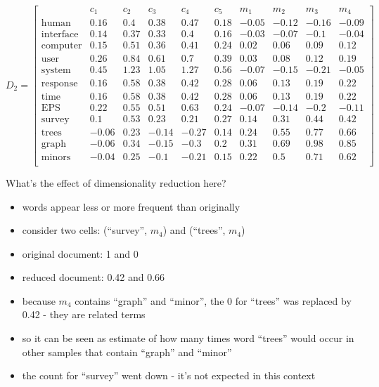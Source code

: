 $$D_2 =
\left[\begin{array}{c|ccccccccc}
 & c_1 & c_2 & c_3 & c_4 & c_5 & m_1 & m_2 & m_3 & m_4 \\
\hline
\text{human} & 0.16 & 0.4 & 0.38 & 0.47 & 0.18 & -0.05 & -0.12 & -0.16 & -0.09 \\
\text{interface} & 0.14 & 0.37 & 0.33 & 0.4 & 0.16 & -0.03 & -0.07 & -0.1 & -0.04 \\
\text{computer} & 0.15 & 0.51 & 0.36 & 0.41 & 0.24 & 0.02 & 0.06 & 0.09 & 0.12 \\
\text{user} & 0.26 & 0.84 & 0.61 & 0.7 & 0.39 & 0.03 & 0.08 & 0.12 & 0.19 \\
\text{system} & 0.45 & 1.23 & 1.05 & 1.27 & 0.56 & -0.07 & -0.15 & -0.21 & -0.05 \\
\text{response} & 0.16 & 0.58 & 0.38 & 0.42 & 0.28 & 0.06 & 0.13 & 0.19 & 0.22 \\
\text{time} & 0.16 & 0.58 & 0.38 & 0.42 & 0.28 & 0.06 & 0.13 & 0.19 & 0.22 \\
\text{EPS} & 0.22 & 0.55 & 0.51 & 0.63 & 0.24 & -0.07 & -0.14 & -0.2 & -0.11 \\
\text{survey} & 0.1 & 0.53 & 0.23 & 0.21 & 0.27 & 0.14 & 0.31 & 0.44 & 0.42 \\
\text{trees} &-0.06 & 0.23 & -0.14 & -0.27 & 0.14 & 0.24 & 0.55 & 0.77 & 0.66 \\
\text{graph} &-0.06 & 0.34 & -0.15 & -0.3 & 0.2 & 0.31 & 0.69 & 0.98 & 0.85 \\
\text{minors} &-0.04 & 0.25 & -0.1 & -0.21 & 0.15 & 0.22 & 0.5 & 0.71 & 0.62 \\
\end{array}\right]$$


What's the effect of dimensionality reduction here?

\begin{itemize}
\itemsep1pt\parskip0pt
\item
  words appear less or more frequent than originally
\item
  consider two cells: (``survey'', $m_4$) and (``trees'', $m_4$)
\item
  original document: 1 and 0
\item
  reduced document: 0.42 and 0.66
\item
  because $m_4$ contains ``graph'' and ``minor'', the 0 for ``trees''
  was replaced by 0.42 - they are related terms
\item
  so it can be seen as estimate of how many times word ``trees'' would
  occur in other samples that contain ``graph'' and ``minor''
\item
  the count for ``survey'' went down - it's not expected in this context
\end{itemize}

